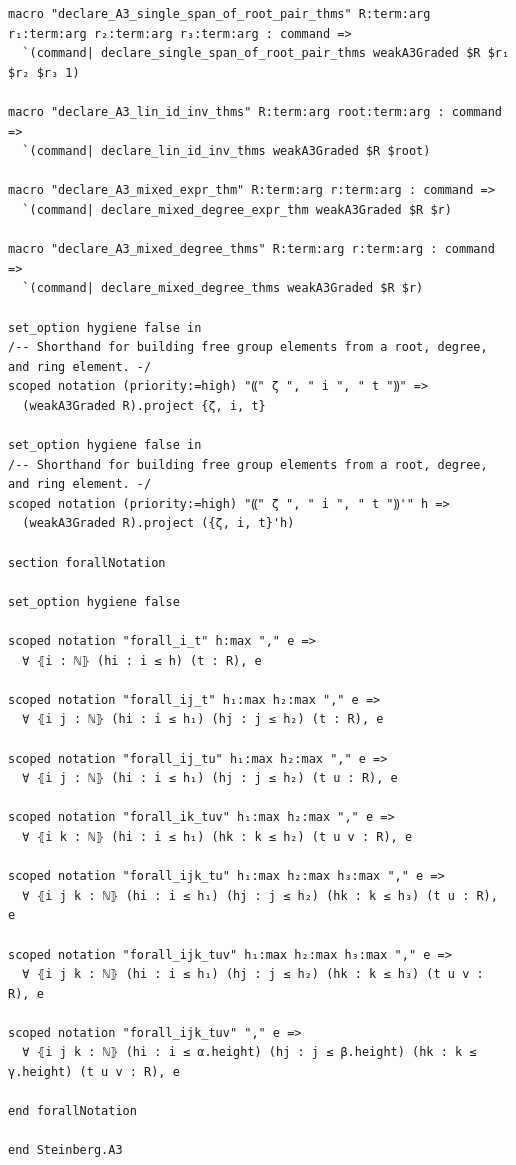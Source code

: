 \documentclass[10pt,a4paper]{article}
\begin{document}
\begin{Verbatim}
macro "declare_A3_single_span_of_root_pair_thms" R:term:arg r₁:term:arg r₂:term:arg r₃:term:arg : command =>
  `(command| declare_single_span_of_root_pair_thms weakA3Graded $R $r₁ $r₂ $r₃ 1)

macro "declare_A3_lin_id_inv_thms" R:term:arg root:term:arg : command =>
  `(command| declare_lin_id_inv_thms weakA3Graded $R $root)

macro "declare_A3_mixed_expr_thm" R:term:arg r:term:arg : command =>
  `(command| declare_mixed_degree_expr_thm weakA3Graded $R $r)

macro "declare_A3_mixed_degree_thms" R:term:arg r:term:arg : command =>
  `(command| declare_mixed_degree_thms weakA3Graded $R $r)

set_option hygiene false in
/-- Shorthand for building free group elements from a root, degree, and ring element. -/
scoped notation (priority:=high) "⸨" ζ ", " i ", " t "⸩" =>
  (weakA3Graded R).project {ζ, i, t}

set_option hygiene false in
/-- Shorthand for building free group elements from a root, degree, and ring element. -/
scoped notation (priority:=high) "⸨" ζ ", " i ", " t "⸩'" h =>
  (weakA3Graded R).project ({ζ, i, t}'h)

section forallNotation

set_option hygiene false

scoped notation "forall_i_t" h:max "," e =>
  ∀ ⦃i : ℕ⦄ (hi : i ≤ h) (t : R), e

scoped notation "forall_ij_t" h₁:max h₂:max "," e =>
  ∀ ⦃i j : ℕ⦄ (hi : i ≤ h₁) (hj : j ≤ h₂) (t : R), e

scoped notation "forall_ij_tu" h₁:max h₂:max "," e =>
  ∀ ⦃i j : ℕ⦄ (hi : i ≤ h₁) (hj : j ≤ h₂) (t u : R), e

scoped notation "forall_ik_tuv" h₁:max h₂:max "," e =>
  ∀ ⦃i k : ℕ⦄ (hi : i ≤ h₁) (hk : k ≤ h₂) (t u v : R), e

scoped notation "forall_ijk_tu" h₁:max h₂:max h₃:max "," e =>
  ∀ ⦃i j k : ℕ⦄ (hi : i ≤ h₁) (hj : j ≤ h₂) (hk : k ≤ h₃) (t u : R), e

scoped notation "forall_ijk_tuv" h₁:max h₂:max h₃:max "," e =>
  ∀ ⦃i j k : ℕ⦄ (hi : i ≤ h₁) (hj : j ≤ h₂) (hk : k ≤ h₃) (t u v : R), e

scoped notation "forall_ijk_tuv" "," e =>
  ∀ ⦃i j k : ℕ⦄ (hi : i ≤ α.height) (hj : j ≤ β.height) (hk : k ≤ γ.height) (t u v : R), e

end forallNotation

end Steinberg.A3
\end{Verbatim}
\end{document}
